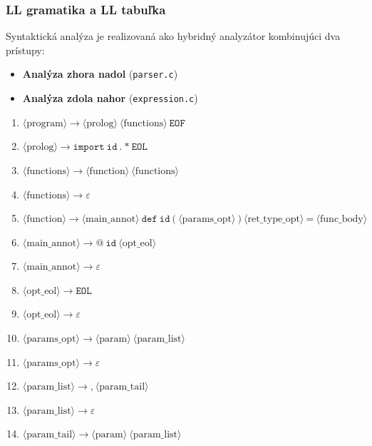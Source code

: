 \subsubsection{LL gramatika a LL tabuľka}

Syntaktická analýza je realizovaná ako hybridný analyzátor kombinujúci dva prístupy:
\begin{itemize}
    \item \textbf{Analýza zhora nadol} (\texttt{parser.c}) 
    \item \textbf{Analýza zdola nahor} (\texttt{expression.c}) 
\end{itemize}


\begin{enumerate}
    \item $\langle\text{program}\rangle \to \langle\text{prolog}\rangle\ \langle\text{functions}\rangle\ \texttt{EOF}$
    \item $\langle\text{prolog}\rangle \to \texttt{import}\ \texttt{id}\ \texttt{.}\ \texttt{*}\ \texttt{EOL}$
    \item $\langle\text{functions}\rangle \to \langle\text{function}\rangle\ \langle\text{functions}\rangle$
    \item $\langle\text{functions}\rangle \to \varepsilon$
    \item $\langle\text{function}\rangle \to \langle\text{main\_annot}\rangle\ \texttt{def}\ \texttt{id}\ \texttt{(}\ \langle\text{params\_opt}\rangle\ \texttt{)}\ \langle\text{ret\_type\_opt}\rangle\ \texttt{=}\ \langle\text{func\_body}\rangle$
    \item $\langle\text{main\_annot}\rangle \to \texttt{@}\ \texttt{id}\ \langle\text{opt\_eol}\rangle$
    \item $\langle\text{main\_annot}\rangle \to \varepsilon$
    \item $\langle\text{opt\_eol}\rangle \to \texttt{EOL}$
    \item $\langle\text{opt\_eol}\rangle \to \varepsilon$
    \item $\langle\text{params\_opt}\rangle \to \langle\text{param}\rangle\ \langle\text{param\_list}\rangle$
    \item $\langle\text{params\_opt}\rangle \to \varepsilon$
    \item $\langle\text{param\_list}\rangle \to \texttt{,}\ \langle\text{param\_tail}\rangle$
    \item $\langle\text{param\_list}\rangle \to \varepsilon$
    \item $\langle\text{param\_tail}\rangle \to \langle\text{param}\rangle\ \langle\text{param\_list}\rangle$

\end{enumerate}
